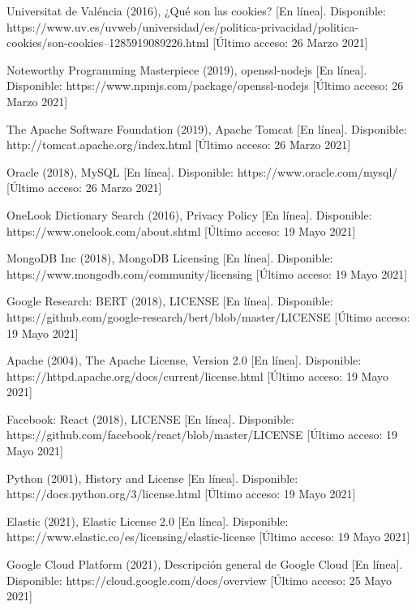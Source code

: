 \documentclass[12pt, a4paper, titlepage]{report}
\begin{document}
\begin{thebibliography}{20}
	Universitat de Valéncia (2016), ¿Qué son las cookies? [En línea]. Disponible:           https://www.uv.es/uvweb/universidad/es/politica-privacidad/politica-cookies/son-cookies--1285919089226.html [Último acceso: 26 Marzo 2021]
	
	Noteworthy Programming Masterpiece (2019), openssl-nodejs [En línea]. Disponible: https://www.npmjs.com/package/openssl-nodejs [Último acceso: 26 Marzo 2021]
	
	The Apache Software Foundation (2019), Apache Tomcat [En línea]. Disponible: http://tomcat.apache.org/index.html [Último acceso: 26 Marzo 2021]
	
	Oracle (2018), MySQL [En línea]. Disponible: https://www.oracle.com/mysql/ [Último acceso: 26 Marzo 2021]
	
	OneLook Dictionary Search (2016), Privacy Policy [En línea]. Disponible: https://www.onelook.com/about.shtml [Último acceso: 19 Mayo 2021]
	
	MongoDB Inc (2018), MongoDB Licensing [En línea]. Disponible: https://www.mongodb.com/community/licensing [Último acceso: 19 Mayo 2021]
	
	Google Research: BERT (2018), LICENSE [En línea]. Disponible: https://github.com/google-research/bert/blob/master/LICENSE [Último acceso: 19 Mayo 2021]
	
	Apache (2004), The Apache License, Version 2.0 [En línea]. Disponible: https://httpd.apache.org/docs/current/license.html [Último acceso: 19 Mayo 2021]
	
	Facebook: React (2018), LICENSE [En línea]. Disponible: https://github.com/facebook/react/blob/master/LICENSE [Último acceso: 19 Mayo 2021]
	
	Python (2001), History and License [En línea]. Disponible: https://docs.python.org/3/license.html [Último acceso: 19 Mayo 2021]
	
	Elastic (2021), Elastic License 2.0 [En línea]. Disponible: https://www.elastic.co/es/licensing/elastic-license [Último acceso: 19 Mayo 2021]
	
	Google Cloud Platform (2021), Descripción general de Google Cloud [En línea]. Disponible: https://cloud.google.com/docs/overview [Último acceso: 25 Mayo 2021]
	

\end{thebibliography}
\end{document}
